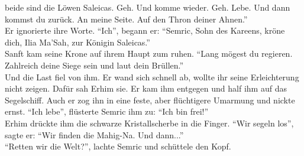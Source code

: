 beide sind die Löwen Saleicas. Geh. Und komme wieder. Geh. Lebe. Und dann kommst du zurück. An 
meine Seite. Auf den Thron deiner Ahnen.''\\
Er ignorierte ihre Worte. ``Ich'', begann er: ``Semric, Sohn des Kareens, kröne dich, Ilia Ma'Sah, 
zur Königin Saleicas.''\\
Sanft kam seine Krone auf ihrem Haupt zum ruhen. ``Lang mögest du regieren. Zahlreich deine Siege 
sein und laut dein Brüllen.''\\
Und die Last fiel von ihm. Er wand sich schnell ab, wollte ihr seine Erleichterung nicht zeigen. 
Dafür sah Erhim sie. Er kam ihm entgegen und half ihm auf das Segelschiff. Auch er zog ihn in eine 
feste, aber flüchtigere Umarmung und nickte ernst. ``Ich lebe'', flüsterte Semric ihm zu: ``Ich bin 
frei!''\\
Erhim drückte ihm die schwarze Kristallscherbe in die Finger. ``Wir segeln los'', sagte er: ``Wir 
finden die Mahig-Na. Und dann...''\\
``Retten wir die Welt?'', lachte Semric und schüttele den Kopf.
